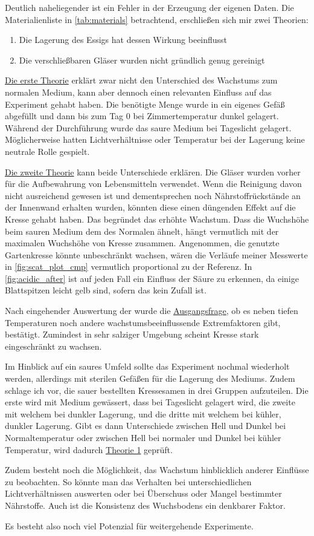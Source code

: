     Deutlich naheliegender ist ein Fehler in der Erzeugung der eigenen Daten. Die Materialienliste in \autoref{tab:materials} betrachtend, erschließen sich mir zwei Theorien:
    \begin{enumerate}[1.]
        \item \label{th:1} Die Lagerung des Essigs hat dessen Wirkung beeinflusst
        \item \label{th:2} Die verschließbaren Gläser wurden nicht gründlich genug gereinigt
    \end{enumerate} 
    \hyperref[th:1]{Die erste Theorie} erklärt zwar nicht den Unterschied des Wachstums zum normalen Medium, kann aber dennoch einen relevanten Einfluss auf das Experiment gehabt haben. Die benötigte Menge wurde in ein eigenes Gefäß abgefüllt und dann bis zum Tag 0 bei Zimmertemperatur dunkel gelagert. Während der Durchführung wurde das saure Medium bei Tageslicht gelagert. Möglicherweise hatten Lichtverhältnisse oder Temperatur bei der Lagerung keine neutrale Rolle gespielt.

    \hyperref[th:2]{Die zweite Theorie} kann beide Unterschiede erklären. Die Gläser wurden vorher für die Aufbewahrung von Lebensmitteln verwendet. Wenn die Reinigung davon nicht ausreichend gewesen ist und dementsprechen noch Nährstoffrückstände an der Innenwand erhalten wurden, könnten diese einen düngenden Effekt auf die Kresse gehabt haben. Das begründet das erhöhte Wachstum. Dass die Wuchshöhe beim sauren Medium dem des Normalen ähnelt, hängt vermutlich mit der maximalen Wuchshöhe von Kresse zusammen. Angenommen, die genutzte Gartenkresse könnte unbeschränkt wachsen, wären die Verläufe meiner Messwerte in \autoref{fig:scat_plot_cmp} vermutlich proportional zu der Referenz. In \autoref{fig:acidic_after} ist auf jeden Fall ein Einfluss der Säure zu erkennen, da einige Blattspitzen leicht gelb sind, sofern das kein Zufall ist.

    Nach eingehender Auswertung der  wurde die \hyperref[hypothese]{Ausgangsfrage}, ob es neben tiefen Temperaturen noch andere wachstumsbeeinflussende Extremfaktoren gibt, bestätigt. Zumindest in sehr salziger Umgebung scheint Kresse stark eingeschränkt zu wachsen.

    Im Hinblick auf ein saures Umfeld sollte das Experiment nochmal wiederholt werden, allerdings mit sterilen Gefäßen für die Lagerung des Mediums. Zudem schlage ich vor, die sauer bestellten Kressesamen in drei Gruppen aufzuteilen. Die erste wird mit Medium gewässert, dass bei Tageslicht gelagert wird, die zweite mit welchem bei dunkler Lagerung, und die dritte mit welchem bei kühler, dunkler Lagerung. Gibt es dann Unterschiede zwischen Hell und Dunkel bei Normaltemperatur oder zwischen Hell bei normaler und Dunkel bei kühler Temperatur, wird dadurch \hyperref[th:1]{Theorie 1} geprüft.

    Zudem besteht noch die Möglichkeit, das Wachstum hinblicklich anderer Einflüsse zu beobachten. So könnte man das Verhalten bei unterschiedlichen Lichtverhältnissen auswerten oder bei Überschuss oder Mangel bestimmter Nährstoffe. Auch ist die Konsistenz des Wuchsbodens ein denkbarer Faktor.

    Es besteht also noch viel Potenzial für weitergehende Experimente.
